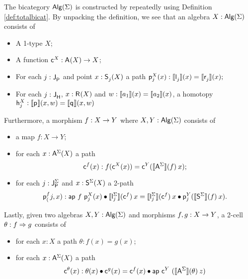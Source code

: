 The bicategory $\algM(\sign)$ is constructed by repeatedly using Definition \ref{def:totalbicat}.
By unpacking the definition, we see that an algebra $X : \algM(\sign)$ consists of
\begin{itemize}
	\item A 1-type $X$;
	\item A function $\AlgPoint{X} : \polyAct{\pointconstr}{X} \rightarrow X$;
	\item For each $j : \pathlabel$ and point $x : \polyAct{\patharg_j}{X}$ a path
	$
	\AlgPath{X}{j}(x) : \semE{\pathleft_j}(x) = \semE{\pathright_j}(x);
	$
	\item For each $j : \homotlabel$, $x : \polyAct{\homotpointarg}{X}$ and $w : \semE{a_1}(x) = \semE{a_2}(x)$, a homotopy
	$
	\AlgHomot{X}{j} : \semH{\homotleft}(x, w) = \semH{\homotright}(x, w)
	$
\end{itemize}
Furthermore, a morphism $f : X \onecell Y$ where $X, Y : \algM(\sign)$ consists of
\begin{itemize}
	\item a map $f : X \rightarrow Y$;
	\item for each $x : \polyAct{\pointconstr[\sign]}{X}$ a path
	\[
	\AlgMapPoint{f}(x) : f(\AlgPoint{X}(x)) = \AlgPoint{Y}(\semP{\pointconstr[\sign]}(f) \> x);
	\]
	\item for each $j : \pathlabel[\sign]$ and $x : \polyAct{\patharg[\sign]}{X}$ a 2-path
	\[
	\AlgMapPath{f}(j, x) :
	\ap{f}{\AlgPath{X}{j}(x)} \vcomp \semE{\pathleft[\sign]_j}(\AlgMapPoint{f}) \> x
	=
	\semE{\pathleft[\sign]_j}(\AlgMapPoint{f}) \> x \vcomp \AlgPath{Y}{j}(\semP{\patharg[\sign]}(f) \> x).
	\]
\end{itemize}
Lastly, given two algebras $X, Y : \algM(\sign)$ and morphisms $f, g : X \onecell Y$, a 2-cell $\theta : f \twocell g$ consists of
\begin{itemize}
	\item for each $x : X$ a path $\theta : f(x) = g(x)$;
	\item for each $x : \polyAct{\pointconstr[\sign]}{X}$ a path
	\[
	\AlgCellPoint{\theta}(x) : 
	\theta(x) \vcomp \AlgMapPoint{g}(x)
	=
	\AlgMapPoint{f}(x)
	\vcomp
	\ap{\AlgPoint{Y}}{(\semP{\pointconstr[\sign]}(\theta) \> z)}
	\]
\end{itemize}